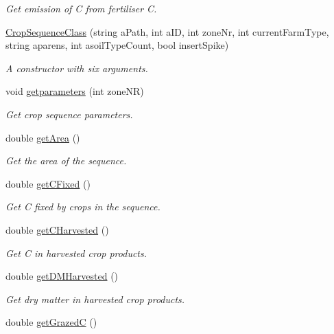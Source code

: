 \begin{DoxyCompactItemize}
\begin{DoxyCompactList}\small\item\em Get emission of C from fertiliser C. \end{DoxyCompactList}\item 
\mbox{\hyperlink{class_crop_sequence_class_a0013767aa3275e61eed72c93a8fe8c88}{Crop\+Sequence\+Class}} (string a\+Path, int a\+ID, int zone\+Nr, int current\+Farm\+Type, string aparens, int asoil\+Type\+Count, bool insert\+Spike)
\begin{DoxyCompactList}\small\item\em A constructor with six arguments. \end{DoxyCompactList}\item 
void \mbox{\hyperlink{class_crop_sequence_class_a5194164b45adf2baf7920142ce9af52d}{getparameters}} (int zone\+NR)
\begin{DoxyCompactList}\small\item\em Get crop sequence parameters. \end{DoxyCompactList}\item 
double \mbox{\hyperlink{class_crop_sequence_class_aa8158757aaa97946f03d91b39a2b597e}{get\+Area}} ()
\begin{DoxyCompactList}\small\item\em Get the area of the sequence. \end{DoxyCompactList}\item 
double \mbox{\hyperlink{class_crop_sequence_class_a166831b02adbb3428ef7989c4dde6d4b}{get\+C\+Fixed}} ()
\begin{DoxyCompactList}\small\item\em Get C fixed by crops in the sequence. \end{DoxyCompactList}\item 
double \mbox{\hyperlink{class_crop_sequence_class_a9bc2f3e9444586ed86c4603aa91fb9b6}{get\+C\+Harvested}} ()
\begin{DoxyCompactList}\small\item\em Get C in harvested crop products. \end{DoxyCompactList}\item 
double \mbox{\hyperlink{class_crop_sequence_class_a030d38e4cb8fb6c2185899a774e6df57}{get\+D\+M\+Harvested}} ()
\begin{DoxyCompactList}\small\item\em Get dry matter in harvested crop products. \end{DoxyCompactList}\item 
double \mbox{\hyperlink{class_crop_sequence_class_aa8f5a123e42333f86e3282c134298864}{get\+GrazedC}} ()

\end{DoxyCompactItemize}

